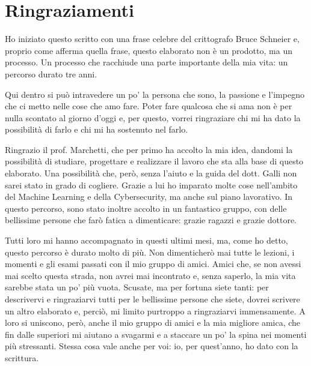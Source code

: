 \chapter*{Ringraziamenti}

Ho iniziato questo scritto con una frase celebre del crittografo Bruce Schneier e, proprio come afferma quella frase, questo elaborato non è un prodotto, ma un processo.
Un processo che racchiude una parte importante della mia vita: un percorso durato tre anni.

Qui dentro si può intravedere un po' la persona che sono, la passione e l'impegno che ci metto nelle cose che amo fare.
Poter fare qualcosa che si ama non è per nulla scontato al giorno d'oggi e, per questo, vorrei ringraziare chi mi ha dato la possibilità di farlo e chi mi ha sostenuto nel farlo.

Ringrazio il prof. Marchetti, che per primo ha accolto la mia idea, dandomi la possibilità di studiare, progettare e realizzare il lavoro che sta alla base di questo elaborato.
Una possibilità che, però, senza l'aiuto e la guida del dott. Galli non sarei stato in grado di cogliere.
Grazie a lui ho imparato molte cose nell'ambito del Machine Learning e della Cybersecurity, ma anche sul piano lavorativo. 
In questo percorso, sono stato inoltre accolto in un fantastico gruppo, con delle bellissime persone che farò fatica a dimenticare: grazie ragazzi e grazie dottore.

Tutti loro mi hanno accompagnato in questi ultimi mesi, ma, come ho detto, questo percorso è durato molto di più.
Non dimenticherò mai tutte le lezioni, i momenti e gli esami passati con il mio gruppo di amici.
Amici che, se non avessi mai scelto questa strada, non avrei mai incontrato e, senza saperlo, la mia vita sarebbe stata un po' più vuota.
Scusate, ma per fortuna siete tanti: per descrivervi e ringraziarvi tutti per le bellissime persone che siete, dovrei scrivere un altro elaborato e, perciò, mi limito purtroppo a ringraziarvi immensamente.
A loro si uniscono, però, anche il mio gruppo di amici e la mia migliore amica, che fin dalle superiori mi aiutano a svagarmi e a staccare un po' la spina nei momenti più stressanti.
Stessa cosa vale anche per voi: io, per quest'anno, ho dato con la scrittura.

